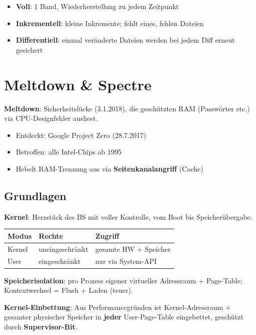 \documentclass[11pt, a4paper]{article}
\begin{document}
\begin{itemize}
  \item \textbf{Voll}: 1 Band, Wiederherstellung zu jedem Zeitpunkt
  \item \textbf{Inkrementell}: kleine Inkremente; fehlt eines, fehlen Dateien
  \item \textbf{Differentiell}: einmal veränderte Dateien werden bei jedem Diff erneut gesichert
\end{itemize}


\section{Meltdown \& Spectre}

\textbf{Meltdown}: Sicherheitslücke (3.1.2018), die geschützten RAM (Passwörter etc.) via CPU-Designfehler ausliest.

\begin{itemize}
  \item Entdeckt: Google Project Zero (28.7.2017)
  \item Betroffen: alle Intel-Chips ab 1995
  \item Hebelt RAM-Trennung aus via \textbf{Seitenkanalangriff} (Cache)
\end{itemize}


\subsection{Grundlagen}

\textbf{Kernel}: Herzstück des BS mit voller Kontrolle, vom Boot bis Speicherübergabe.



{\small
\begin{tabularx}{\linewidth}{XXX}
\hline
\rowcolor{tableheadbg}
{\color{white}\textbf{Modus}} & {\color{white}\textbf{Rechte}} & {\color{white}\textbf{Zugriff}} \\[2pt]
\hline
\endhead
\hline
\endfoot
Kernel & uneingeschränkt & gesamte HW + Speicher \\
User & eingeschränkt & nur via System-API \\
\end{tabularx}
}


\textbf{Speicherisolation}: pro Prozess eigener virtueller Adressraum + Page-Table; Kontextwechsel = Flush + Laden (teuer).


\textbf{Kernel-Einbettung}: Aus Performancegründen ist Kernel-Adressraum + gesamter physischer Speicher in \textbf{jeder} User-Page-Table eingebettet, geschützt durch \textbf{Supervisor-Bit}.
\end{document}
